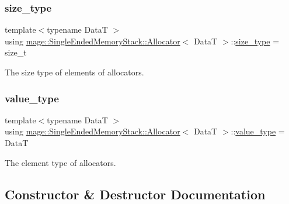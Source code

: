 \subsubsection{\texorpdfstring{size\+\_\+type}{size\_type}}
{\footnotesize\ttfamily template$<$typename DataT $>$ \\
using \hyperlink{structmage_1_1_single_ended_memory_stack_1_1_allocator}{mage\+::\+Single\+Ended\+Memory\+Stack\+::\+Allocator}$<$ DataT $>$\+::\hyperlink{structmage_1_1_single_ended_memory_stack_1_1_allocator_af04b72c8781cfb7148d8f0d4b0da41c3}{size\+\_\+type} =  size\+\_\+t}

The size type of elements of allocators. \hypertarget{structmage_1_1_single_ended_memory_stack_1_1_allocator_a4d5b98a534ad4e6d6f2d8eb1280398ab}{}\label{structmage_1_1_single_ended_memory_stack_1_1_allocator_a4d5b98a534ad4e6d6f2d8eb1280398ab} 
\subsubsection{\texorpdfstring{value\+\_\+type}{value\_type}}
{\footnotesize\ttfamily template$<$typename DataT $>$ \\
using \hyperlink{structmage_1_1_single_ended_memory_stack_1_1_allocator}{mage\+::\+Single\+Ended\+Memory\+Stack\+::\+Allocator}$<$ DataT $>$\+::\hyperlink{structmage_1_1_single_ended_memory_stack_1_1_allocator_a4d5b98a534ad4e6d6f2d8eb1280398ab}{value\+\_\+type} =  DataT}

The element type of allocators. 

\subsection{Constructor \& Destructor Documentation}
\hypertarget{structmage_1_1_single_ended_memory_stack_1_1_allocator_acc7f17e870881240ee354efe69f9ba34}{}\label{structmage_1_1_single_ended_memory_stack_1_1_allocator_acc7f17e870881240ee354efe69f9ba34} 
